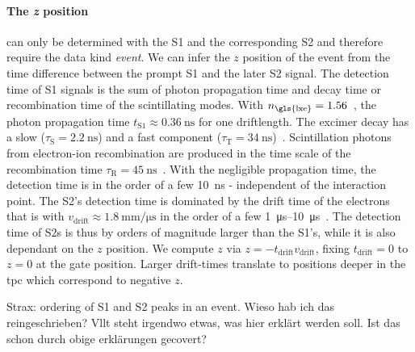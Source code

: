 \paragraph{The \emph{z} position} can only be determined with the S1 and the corresponding S2 and therefore require the data kind \emph{event}.
We can infer the $ z $ position of the event from the time difference between the prompt S1 and the later S2 signal.
The detection time of S1 signals is the sum of photon propagation time and decay time or recombination time of the scintillating modes.
With $ n_\mathrm{\gls{lxe}} = 1.56 $~\cite{Solovov04}, the photon propagation time $ t_\mathrm{S1} \approx \SI{0.36}{\nano\second} $ for one driftlength.
The excimer decay has a slow ($ \tau_\mathrm{S} = \SI{2.2}{\nano\second} $) and a fast component ($ \tau_\mathrm{T} = \SI{34}{\nano\second} $)~\cite{Kubota78}.
Scintillation photons from electron-ion recombination are produced in the time scale of the recombination time $ \tau_\mathrm{R} = \SI{45}{\nano\second} $~\cite{Hitachi83}.
With the negligible propagation time, the detection time is in the order of a few \SI{10}{\nano\second} - independent of the interaction point.
The S2's detection time is dominated by the drift time of the electrons that is with $ v_\mathrm{drift} \approx \SI{1.8}{\milli\meter\per\micro\second} $ in the order of a few \SIrange{1}{10}{\micro\second}~\cite{Aalbers18}.
The detection time of S2s is thus by orders of magnitude larger than the S1's, while it is also dependant on the $ z $ position.
We compute $ z $ via $ z = - t_\mathrm{drift} v_\mathrm{drift} $, fixing $ t_\mathrm{drift} = 0 $ to $ z = 0 $ at the gate position.
Larger drift-times translate to positions deeper in the \gls{tpc} which correspond to negative $ z $.





Strax: ordering of S1 and S2 peaks in an event. Wieso hab ich das reingeschrieben? Vllt steht irgendwo etwas, was hier erklärt werden soll. Ist das schon durch obige erklärungen gecovert?
